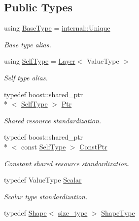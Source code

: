 \subsection*{Public Types}
\begin{DoxyCompactItemize}
\item 
using \hyperlink{classffnn_1_1layer_1_1_layer_a8946a9a8641a2760394238ce836b7df4}{Base\-Type} = \hyperlink{classffnn_1_1internal_1_1_unique}{internal\-::\-Unique}
\begin{DoxyCompactList}\small\item\em Base type alias. \end{DoxyCompactList}\item 
using \hyperlink{classffnn_1_1layer_1_1_layer_a01db5ce644b97af72dca31a759aa33c5}{Self\-Type} = \hyperlink{classffnn_1_1layer_1_1_layer}{Layer}$<$ Value\-Type $>$
\begin{DoxyCompactList}\small\item\em Self type alias. \end{DoxyCompactList}\item 
typedef boost\-::shared\-\_\-ptr\\*
$<$ \hyperlink{classffnn_1_1layer_1_1_layer_a01db5ce644b97af72dca31a759aa33c5}{Self\-Type} $>$ \hyperlink{classffnn_1_1layer_1_1_layer_ac7c8ad3ab68dbb629077e9ace21871dc}{Ptr}
\begin{DoxyCompactList}\small\item\em Shared resource standardization. \end{DoxyCompactList}\item 
typedef boost\-::shared\-\_\-ptr\\*
$<$ const \hyperlink{classffnn_1_1layer_1_1_layer_a01db5ce644b97af72dca31a759aa33c5}{Self\-Type} $>$ \hyperlink{classffnn_1_1layer_1_1_layer_adc3e5427239b7ce83615364d859ef449}{Const\-Ptr}
\begin{DoxyCompactList}\small\item\em Constant shared resource standardization. \end{DoxyCompactList}\item 
typedef Value\-Type \hyperlink{classffnn_1_1layer_1_1_layer_ab3b9b082aed9ee8d4e30a823b723a740}{Scalar}
\begin{DoxyCompactList}\small\item\em Scalar type standardization. \end{DoxyCompactList}\item 
typedef \hyperlink{structffnn_1_1layer_1_1_shape}{Shape}$<$ \hyperlink{namespaceffnn_a63b90a2fd70eb76684eac482a51633e5}{size\-\_\-type} $>$ \hyperlink{classffnn_1_1layer_1_1_layer_ae2f2d0063ab4b2c2a3a6ebf81f4ec32f}{Shape\-Type}

\end{DoxyCompactItemize}
